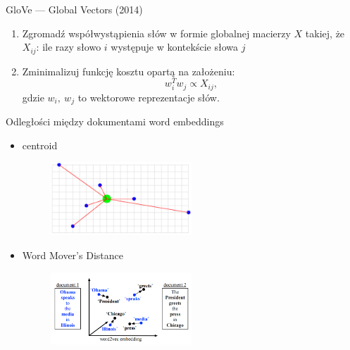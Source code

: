\documentclass{beamer}
\begin{document}
	\begin{frame}{GloVe --- Global Vectors (2014)}


\begin{enumerate}
	\setlength\itemsep{2em}
	\item Zgromadź współwystąpienia słów w formie globalnej macierzy $X$ takiej, że
	$X_{ij}$: ile razy słowo $i$ występuje w kontekście słowa $j$

	\item Zminimalizuj funkcję kosztu opartą na założeniu:
	\begin{equation}
	w_i^Tw_j \propto X_{ij},
	\end{equation}
	gdzie $w_i,\ w_j$ to wektorowe reprezentacje słów.
\end{enumerate}
	\end{frame}
	\begin{frame}{Odległości między dokumentami word embeddings}
				\begin{itemize}
					\item centroid
							\begin{figure}
								\centering
								\includegraphics[width=0.5\textwidth]{img/centroid.png}
							\end{figure}
					\item Word Mover's Distance
							\begin{figure}
								\centering
								\includegraphics[width=0.5\textwidth]{img/wmd.png}
							\end{figure}
				\end{itemize}

	\end{frame}
\end{document}
